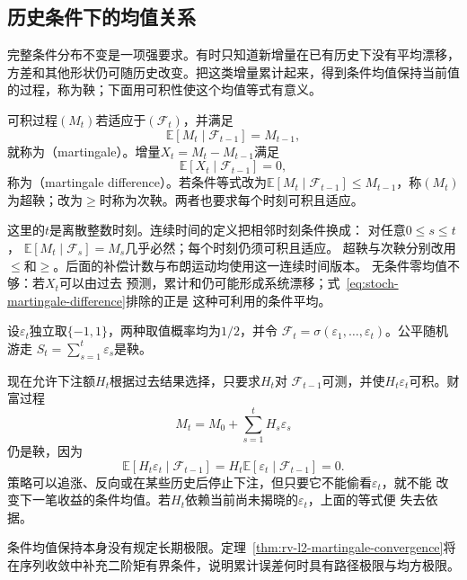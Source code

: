 \subsection{历史条件下的均值关系}

完整条件分布不变是一项强要求。有时只知道新增量在已有历史下没有平均漂移，方差和其他形状仍可随历史改变。把这类增量累计起来，得到条件均值保持当前值的过程，称为鞅；下面用可积性使这个均值等式有意义。
\label{sec:rv-martingales}
\begin{definition}[鞅与鞅差]
  \label{def:stoch-martingale}
可积过程$(M_t)$若适应于$(\mathcal{F}_t)$，并满足
\begin{equation}
  \mathbb{E}[M_t\mid\mathcal{F}_{t-1}]=M_{t-1},
  \label{eq:stoch-martingale-definition}
\end{equation}
就称为（martingale）。增量$X_t=M_t-M_{t-1}$满足
\begin{equation}
  \mathbb{E}[X_t\mid\mathcal{F}_{t-1}]=0,
  \label{eq:stoch-martingale-difference}
\end{equation}
称为（martingale difference）。若条件等式改为\(\mathbb E[M_t\mid\mathcal F_{t-1}]\leq M_{t-1}\)，称\((M_t)\)为超鞅；改为\(\geq\)时称为次鞅。两者也要求每个时刻可积且适应。
\end{definition}
这里的\(t\)是离散整数时刻。连续时间的定义把相邻时刻条件换成：
对任意\(0\leq s\leq t\)，
\(\mathbb E[M_t\mid\mathcal F_s]=M_s\)几乎必然；每个时刻仍须可积且适应。
超鞅与次鞅分别改用\(\leq\)和\(\geq\)。后面的补偿计数与布朗运动均使用这一连续时间版本。
无条件零均值不够：若$X_t$可以由过去
预测，累计和仍可能形成系统漂移；式~\eqref{eq:stoch-martingale-difference}排除的正是
这种可利用的条件平均。

\begin{example}[公平随机游走与按过去下注]
  \label{ex:stoch-predictable-betting}
  设$\varepsilon_t$独立取$\{-1,1\}$，两种取值概率均为$1/2$，并令
  $\mathcal{F}_t=\sigma(\varepsilon_1,\ldots,\varepsilon_t)$。公平随机游走
  $S_t=\sum_{s=1}^{t}\varepsilon_s$是鞅。

  现在允许下注额$H_t$根据过去结果选择，只要求$H_t$对
  $\mathcal{F}_{t-1}$可测，并使$H_t\varepsilon_t$可积。财富过程
  \[
    M_t=M_0+\sum_{s=1}^{t}H_s\varepsilon_s
  \]
  仍是鞅，因为
  \[
    \mathbb{E}[H_t\varepsilon_t\mid\mathcal{F}_{t-1}]
    =
    H_t\mathbb{E}[\varepsilon_t\mid\mathcal{F}_{t-1}]
    =0.
  \]
  策略可以追涨、反向或在某些历史后停止下注，但只要它不能偷看$\varepsilon_t$，就不能
  改变下一笔收益的条件均值。若$H_t$依赖当前尚未揭晓的$\varepsilon_t$，上面的等式便
  失去依据。
\end{example}
条件均值保持本身没有规定长期极限。定理~\ref{thm:rv-l2-martingale-convergence}将在序列收敛中补充二阶矩有界条件，说明累计误差何时具有路径极限与均方极限。

